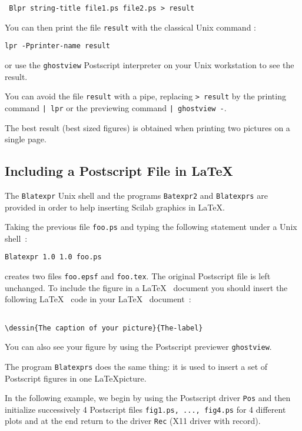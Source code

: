 \begin{verbatim}
 Blpr string-title file1.ps file2.ps > result
\end{verbatim}

You can then print the file  {\tt result} with the classical Unix command :

\begin{verbatim}
lpr -Pprinter-name result
\end{verbatim}

\noindent or use the \verb+ghostview+ Postscript interpreter on your Unix
workstation to see the result.

You can avoid the file {\tt result} with a pipe, replacing {\tt  > result}
by the printing command {\tt | lpr} or the previewing command 
{\tt | ghostview -}.

The best result (best sized figures) is obtained when printing two 
pictures on a single page. 


\subsection{Including a Postscript File in \LaTeX}

The \verb|Blatexpr| Unix shell and the programs \verb+Batexpr2+ and 
\verb+Blatexprs+ are provided in order to help inserting Scilab graphics 
in \LaTeX .

Taking the previous file {\tt foo.ps} and  typing the following statement 
under a Unix shell~:
\begin{verbatim}
Blatexpr 1.0 1.0 foo.ps
\end{verbatim}
creates two files \verb+foo.epsf+ and \verb+foo.tex+. The original
Postscript file is left unchanged. 
To include the figure in a \LaTeX~ document you should insert the following 
\LaTeX~ code in your \LaTeX~ document~:

\begin{verbatim}

\dessin{The caption of your picture}{The-label}
\end{verbatim}

You can also see your figure by using  the  Postscript
previewer \verb+ghostview+.

The program \verb+Blatexprs+ does the same thing: it is used to insert
a set of Postscript figures in one \LaTeX picture.

In the following example, we begin by using the Postscript driver {\tt Pos}
and then initialize successively 4 Postscript files 
{\tt fig1.ps, ..., fig4.ps} for
4 different plots and at the end return to the driver {\tt Rec} (X11 driver
with record).

